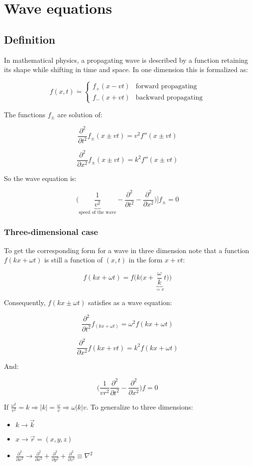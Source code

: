 \chapter{Wave equations}

\section{Definition}
In mathematical physics, a propagating wave is described by a function retaining its shape while shifting in time and space.
In one dimension this is formalized as:

$$f(x,t)\dot{=}\begin{cases}f_+(x-v t) &\text{forward propagating}\\f_-(x+vt) &\text{backward propagating}\end{cases}$$

The functions $f_\pm$ are solution of:

$$\frac{\partial^2{}}{\partial{t^2}}f_\pm(x\pm vt) = v^2f''(x\pm vt)$$

$$\frac{\partial^2{}}{\partial{x^2}}f_\pm(x\pm vt) = k^2f''(x\pm vt)$$

So the wave equation is:

$$\biggl(\underbrace{\frac{1}{v^2}}_{\text{speed of the wave}}-\frac{\partial^2{}}{\partial{t^2}}-\frac{\partial^2{}}{\partial{x^2}}\biggr)]f_\pm = 0$$

  \subsection{Three-dimensional case}
  To get the corresponding form for a wave in three dimension note that a function $f(kx + \omega t)$ is still a function of $(x,t)$ in the form $x+vt$:

  $$f(kx+\omega t) = f\biggl(k\biggl(x+\underbrace{\frac{\omega}{k}}_{=v}t\biggr)\biggr)$$

  Consequently, $f(kx\pm\omega t)$ satisfies as a wave equation:

  $$\frac{\partial^2{}}{\partial{t^2}}f_(kx+ \omega t) = \omega^2f(kx+ \omega t)$$

  $$\frac{\partial^2{}}{\partial{x^2}}f(kx + vt) = k^2f(kx + \omega t)$$

  And: 

  $$\biggl(\frac{1}{vr^2}\frac{\partial^2{}}{\partial{t^2}} - \frac{\partial^2{}}{\partial{x^2}}\biggr)f = 0$$

  If $\frac{\omega^2}{v^2} = k\Rightarrow |k| = \frac{\omega}{v}\Rightarrow \omega|k|v$.
  To generalize to three dimensions:
  \begin{itemize}
    \item $k\rightarrow \vec{k}$
    \item $x\rightarrow \vec{r}=(x,y,z)$
    \item $\frac{\partial^2{}}{\partial{x^2}}\rightarrow \frac{\partial^2{}}{\partial{x^2}}+\frac{\partial^2{}}{\partial{y^2}}+\frac{\partial^2{}}{\partial{z^2}}\equiv\nabla^2$
  \end{itemize}

